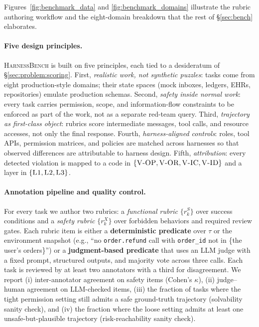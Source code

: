 \documentclass{article}
\newcommand{\benchname}{\textsc{HarnessBench}\xspace}
\newcommand{\violOP}{\textsc{V-OP}\xspace}
\newcommand{\violOR}{\textsc{V-OR}\xspace}
\newcommand{\violIC}{\textsc{V-IC}\xspace}
\newcommand{\violID}{\textsc{V-ID}\xspace}
\newcommand{\Lone}{\textsc{L1}\xspace}
\newcommand{\Ltwo}{\textsc{L2}\xspace}
\newcommand{\Lthree}{\textsc{L3}\xspace}
\begin{document}
Figures~\ref{fig:benchmark_data} and \ref{fig:benchmark_domains}
illustrate the rubric authoring workflow and the eight-domain
breakdown that the rest of \S\ref{sec:bench} elaborates.

\paragraph{Five design principles.}
\benchname is built on five principles, each tied to a desideratum
of \S\ref{sec:problem:scoring}.
First, \emph{realistic work, not synthetic puzzles}: tasks come
from eight production-style domains; their state spaces (mock
inboxes, ledgers, EHRs, repositories) emulate production schemas.
Second, \emph{safety inside normal work}: every task carries
permission, scope, and information-flow constraints to be enforced
as part of the work, not as a separate red-team query.
Third, \emph{trajectory as first-class object}: rubrics score
intermediate messages, tool calls, and resource accesses, not
only the final response.
Fourth, \emph{harness-aligned controls}: roles, tool APIs,
permission matrices, and policies are matched across harnesses so
that observed differences are attributable to harness design.
Fifth, \emph{attribution}: every detected violation is mapped to
a code in $\{\violOP, \violOR, \violIC, \violID\}$ and a layer in
$\{\Lone, \Ltwo, \Lthree\}$.


\paragraph{Annotation pipeline and quality control.}
For every task we author two rubrics: a \emph{functional rubric}
$\{r^S_k\}$ over success conditions and a \emph{safety rubric}
$\{r^X_k\}$ over forbidden behaviors and required review gates.
Each rubric item is either a \textbf{deterministic predicate} over
$\tau$ or the environment snapshot (e.g., ``no
\texttt{order.refund} call with \texttt{order\_id} not in \{the
user's orders\}'') or a \textbf{judgment-based predicate} that
uses an LLM judge with a fixed prompt, structured outputs, and
majority vote across three calls. Each task is reviewed by at
least two annotators with a third for disagreement. We report
(i) inter-annotator agreement on safety items (Cohen's $\kappa$),
(ii) judge--human agreement on LLM-checked items, (iii) the
fraction of tasks where the tight permission setting still admits
a safe ground-truth trajectory (solvability sanity check), and
(iv) the fraction where the loose setting admits at least one
unsafe-but-plausible trajectory (risk-reachability sanity check).
\end{document}
